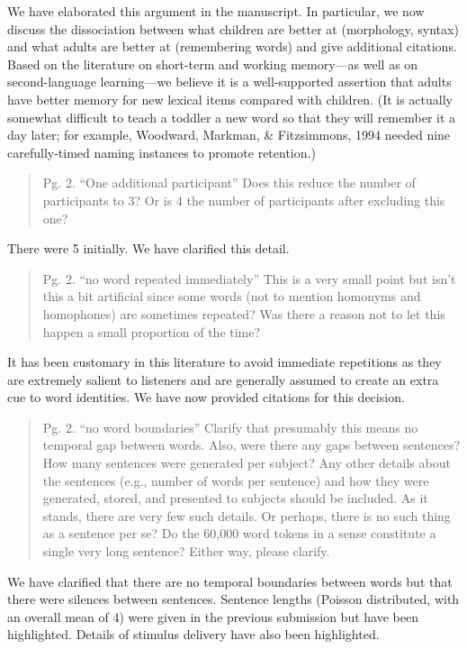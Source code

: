 \documentclass[12pt]{letter}
\begin{document}
We have elaborated this argument in the manuscript. In particular, we now discuss the dissociation between what children are better at (morphology, syntax) and what adults are better at (remembering words) and give additional citations. Based on the literature on short-term and working memory---as well as on second-language learning---we believe it is a well-supported assertion that adults have better memory for new lexical items compared with children. (It is actually somewhat difficult to teach a toddler a new word so that they will remember it a day later; for example, Woodward, Markman, \& Fitzsimmons, 1994 needed nine carefully-timed naming instances to promote retention.)

\begin{quote}
Pg. 2. ``One additional participant'' Does this reduce the number of participants to 3? Or is 4 the number of participants after excluding this one?
\end{quote}

There were 5 initially. We have clarified this detail.

\begin{quote}
Pg. 2. ``no word repeated immediately'' This is a very small point but isn't this a bit artificial since some words (not to mention homonyms and homophones) are sometimes repeated? Was there a reason not to let this happen a small proportion of the time?
\end{quote}

It has been customary in this literature to avoid immediate repetitions as they are extremely salient to listeners and are generally assumed to create an extra cue to word identities. We have now provided citations for this decision.

\begin{quote}
Pg. 2. ``no word boundaries'' Clarify that presumably this means no temporal gap between words. Also, were there any gaps between sentences? How many sentences were generated per subject? Any other details about the sentences (e.g., number of words per sentence) and how they were generated, stored, and presented to subjects should be included. As it stands, there are very few such details. Or perhaps, there is no such thing as a sentence per se? Do the 60,000 word tokens in a sense constitute a single very long sentence? Either way, please clarify.
\end{quote}

We have clarified that there are no temporal boundaries between words but that there were silences between sentences. Sentence lengths (Poisson distributed, with an overall mean of 4) were given in the previous submission but have been highlighted. Details of stimulus delivery have also been highlighted.
\end{document}
